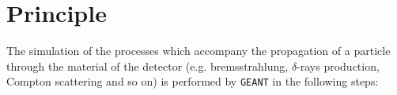 \section {Principle}
The simulation of the processes which accompany the propagation of a
particle through the material of the detector
(e.g. bremsstrahlung,
$\delta$-rays production, Compton scattering and so on)
is performed by {\tt GEANT} in the following steps:
